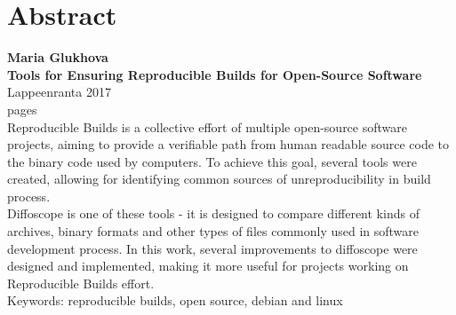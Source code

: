 \section*{Abstract}

\textbf{Maria Glukhova}\\
\textbf{Tools for Ensuring Reproducible Builds for Open-Source Software}\\
Lappeenranta 2017\\
\pageref{LastPage} pages\\

Reproducible Builds is a collective effort of multiple open-source software
projects, aiming to provide a verifiable path from human readable source code
to the binary code used by computers. To achieve this goal, several tools were
created, allowing for identifying common sources of unreproducibility in build
process.\\
Diffoscope is one of these tools - it is designed to compare different kinds of
archives, binary formats and other types of files commonly used in software
development process. In this work, several improvements to diffoscope were
designed and implemented, making it more useful for projects working on
Reproducible Builds effort.\\


Keywords: reproducible builds, open source, debian and linux\\
